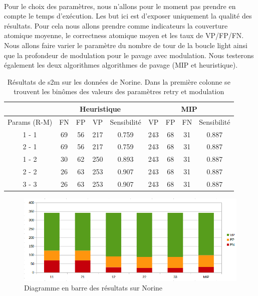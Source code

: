 \documentclass[12pt,french,twoside]{report}
\begin{document}
\paragraph{}Pour le choix des paramètres, nous n'allons pour le moment pas prendre en compte le temps d'exécution.
Les but ici est d'exposer uniquement la qualité des résultats.
Pour cela nous allons prendre comme indicateurs la couverture atomique moyenne, le correctness atomique moyen et les taux de VP/FP/FN.
Nous allons faire varier le paramètre du nombre de tour de la boucle light ainsi que la profondeur de modulation pour le pavage avec modulation.
Nous testerons également les deux algorithmes algorithmes de pavage (MIP et heuristique).

\begin{table}[!ht]
  \centering
  \begin{tabular}{|c|c|c|c|c|c|c|c|c|}
    \hline
    & \multicolumn{4}{c|}{Heuristique} & \multicolumn{4}{c|}{MIP} \\
    \hline
    Params (R-M) & FN & FP & VP & Sensibilité & VP & FP & FN & Sensibilité \\
    \hline
    1 - 1 & 69 & 56 & 217 & 0.759 & 243 & 68 & 31 & 0.887 \\
    \hline
    2 - 1 & 69 & 56 & 217 & 0.759 & 243 & 68 & 31 & 0.887 \\
    \hline
    1 - 2 & 30 & 62 & 250 & 0.893 & 243 & 68 & 31 & 0.887 \\
    \hline
    2 - 2 & 26 & 63 & 253 & 0.907 & 243 & 68 & 31 & 0.887 \\
    \hline
    3 - 3 & 26 & 63 & 253 & 0.907 & 243 & 68 & 31 & 0.887 \\
    \hline
  \end{tabular}
  \caption{\label{nor_results}Résultats de s2m sur les données de Norine.
  Dans la première colonne se trouvent les binômes des valeurs des paramètres retry et modulation}
\end{table}

\begin{figure}[!ht]
  \begin{center}
    \includegraphics[width=450px]{Figures/s2m/results/Norine.png}
    \caption{\label{nor_graph}Diagramme en barre des résultats sur Norine}
  \end{center}
\end{figure}
\end{document}

